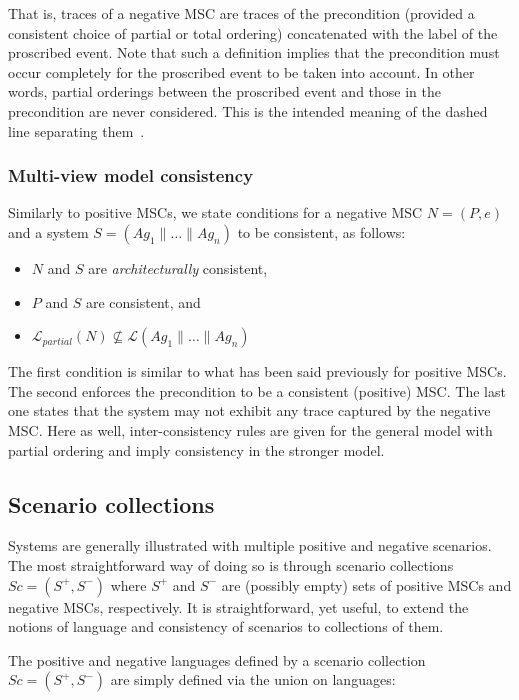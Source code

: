 That is, traces of a negative MSC are traces of the precondition (provided a consistent choice of partial or total ordering) concatenated with the label of the proscribed event. Note that such a definition implies that the precondition must occur completely for the proscribed event to be taken into account. In other words, partial orderings between the proscribed event and those in the precondition are never considered. This is the intended meaning of the dashed line separating them~\cite{Uchitel:2004}. 

\subsubsection*{Multi-view model consistency}

Similarly to positive MSCs, we state conditions for a negative MSC $N = (P,e)$ and a system $S = (Ag_1 \parallel \ldots \parallel Ag_n)$ to be consistent, as follows:

\begin{itemize}
\item $N$ and $S$ are \emph{architecturally} consistent,
\item $P$ and $S$ are consistent, and
\item $\mathcal{L}_{partial}(N) \not\subseteq \mathcal{L}(Ag_1 \parallel \ldots \parallel Ag_n)$
\end{itemize}

The first condition is similar to what has been said previously for positive MSCs. The second enforces the precondition to be a consistent (positive) MSC. The last one states that the system may not exhibit any trace captured by the negative MSC. Here as well, inter-consistency rules are given for the general model with partial ordering and imply consistency in the stronger model.

\subsection{Scenario collections}

Systems are generally illustrated with multiple positive and negative scenarios. The most straightforward way of doing so is through scenario collections $Sc = (S^+,S^-)$ where $S^+$ and $S^-$ are (possibly empty) sets of positive MSCs and negative MSCs, respectively. It is straightforward, yet useful, to extend the notions of language and consistency of scenarios to collections of them. 

The positive and negative languages defined by a scenario collection $Sc = (S^+,S^-)$ are simply defined via the union on languages:

